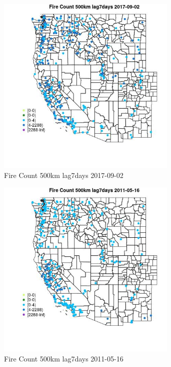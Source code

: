 \begin{figure} 
\centering  
\includegraphics[width=0.77\textwidth]{Code_Outputs/Report_ML_input_PM25_Step4_part_e_de_duplicated_aves_compiled_2019-05-20wNAs_MapObsFire_Count_500km_lag7days2017-09-02.jpg} 
\caption{\label{fig:Report_ML_input_PM25_Step4_part_e_de_duplicated_aves_compiled_2019-05-20wNAsMapObsFire_Count_500km_lag7days2017-09-02}Fire Count 500km lag7days 2017-09-02} 
\end{figure} 
 

\begin{figure} 
\centering  
\includegraphics[width=0.77\textwidth]{Code_Outputs/Report_ML_input_PM25_Step4_part_e_de_duplicated_aves_compiled_2019-05-20wNAs_MapObsFire_Count_500km_lag7days2011-05-16.jpg} 
\caption{\label{fig:Report_ML_input_PM25_Step4_part_e_de_duplicated_aves_compiled_2019-05-20wNAsMapObsFire_Count_500km_lag7days2011-05-16}Fire Count 500km lag7days 2011-05-16} 
\end{figure} 
 

